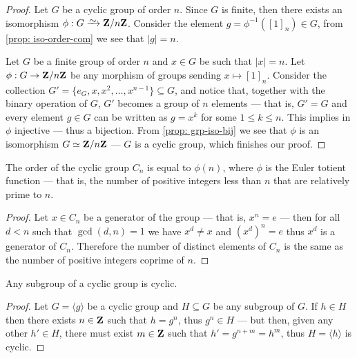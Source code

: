 \begin{proof}
Let \(G\) be a cyclic group of order \(n\). Since \(G\) is finite, then there
exists an isomorphism \(\phi: G \isoto \Z/n\Z\). Consider the element \(g =
\phi^{-1}({[1]}_n) \in G\), from \cref{prop: iso-order-com} we see that \(|g| =
n\).

Let \(G\) be a finite group of order \(n\) and \(x \in G\) be such that \(|x|
= n\). Let \(\phi: G \to \mathbf{Z}/n\mathbf{Z}\) be any morphism of groups sending \(x
\mapsto {[1]}_n\). Consider the collection \(G' = \{e_G, x, x^2, \dots,
x^{n-1}\} \subseteq G\), and notice that, together with the binary operation
of \(G\), \(G'\) becomes a group of \(n\) elements --- that is, \(G' = G\) and
every element \(g \in G\) can be written as \(g = x^k\) for some \(1 \leq k
\leq n\). This implies in \(\phi\) injective --- thus a bijection. From
\cref{prop: grp-iso-bij} we see that \(\phi\) is an isomorphism \(G \simeq
\mathbf{Z}/n\mathbf{Z}\) --- \(G\) is a cyclic group, which finishes our proof.
\end{proof}

\begin{proposition}
\label{prop:order-cyclic-totient}
The order of the cyclic group \(C_n\) is equal to \(\phi(n)\), where \(\phi\) is
the Euler totient function --- that is, the number of positive integers less
than \(n\) that are relatively prime to \(n\).
\end{proposition}

\begin{proof}
Let \(x \in C_n\) be a generator of the group --- that is, \(x^n = e\) --- then
for all \(d < n\) such that \(\gcd(d, n) = 1\) we have \(x^d \neq x\) and
\((x^d)^n = e\) thus \(x^d\) is a generator of \(C_n\). Therefore the number
of distinct elements of \(C_n\) is the same as the number of positive integers
coprime of \(n\).
\end{proof}

\begin{proposition}[Subgroup]
\label{prop:subgroup-of-cyclic-group}
Any subgroup of a cyclic group is cyclic.
\end{proposition}

\begin{proof}
Let \(G = \langle g \rangle\) be a cyclic group and \(H \subseteq G\) be any
subgroup of \(G\). If \(h \in H\) then there exists \(n \in \mathbf{Z}\) such that \(h =
g^n\), thus \(g^n \in H\) --- but then, given any other \(h' \in H\), there must
exist \(m \in \mathbf{Z}\) such that \(h' = g^{n + m} = h^m\), thus \(H = \langle h
\rangle\) is cyclic.
\end{proof}

